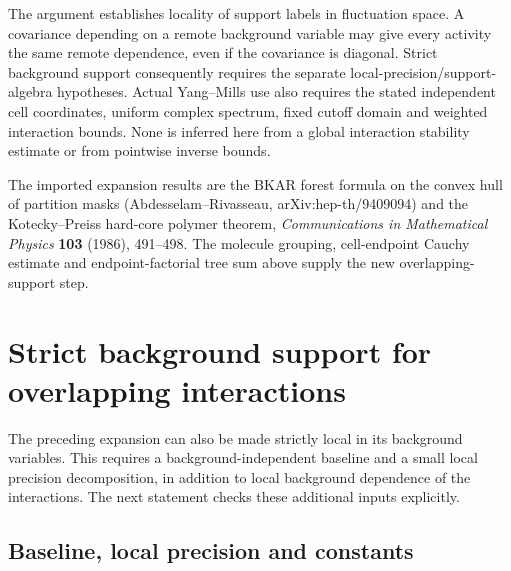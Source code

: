 \documentclass[11pt]{article}
\begin{document}
The argument establishes locality of support labels in fluctuation
space. A covariance depending on a remote background variable may
give every activity the same remote dependence, even if the
covariance is diagonal. Strict background support consequently
requires the separate local-precision/support-algebra hypotheses.
Actual Yang--Mills use also requires the stated independent cell
coordinates, uniform complex spectrum, fixed cutoff domain and
weighted interaction bounds. None is inferred here from a global
interaction stability estimate or from pointwise inverse bounds.

The imported expansion results are the BKAR forest formula on the
convex hull of partition masks (Abdesselam--Rivasseau,
arXiv:hep-th/9409094) and the Kotecky--Preiss hard-core polymer
theorem, \emph{Communications in Mathematical Physics} \textbf{103}
(1986), 491--498. The molecule grouping, cell-endpoint Cauchy
estimate and endpoint-factorial tree sum above supply the new
overlapping-support step.


\section{Strict background support for overlapping interactions}
\label{ob-section}

The preceding expansion can also be made strictly local in its
background variables. This requires a background-independent baseline
and a small local precision decomposition, in addition to local
background dependence of the interactions. The next statement checks
these additional inputs explicitly.

\subsection{Baseline, local precision and constants}
\end{document}

